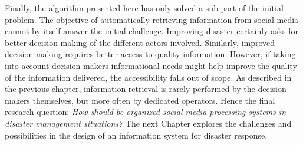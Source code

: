 Finally, the algorithm presented here has only solved a sub-part of the initial problem.
The objective of automatically retrieving information from social media cannot by itself answer the initial challenge.
Improving disaster certainly asks for better decision making of the different actors involved.
Similarly, improved decision making requires better access to quality information.
However, if taking into account decision makers informational needs might help improve
the quality of the information delivered, the accessibility falls out of scope.
As described in the previous chapter, information retrieval is rarely performed by the
decision makers themselves, but more often by dedicated operators.
Hence the final research question: \textit{How should be organized social media processing systems in disaster management situations?}
The next Chapter explores the challenges and possibilities in the design of an information
system for disaster response.

